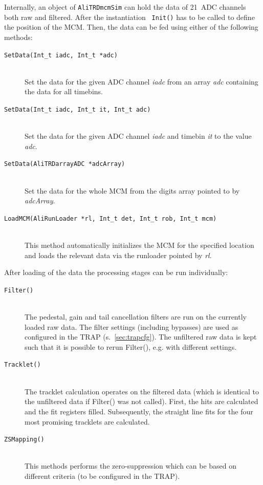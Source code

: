 \documentclass{alicetdr}
\begin{document}
Internally, an object of {\tt AliTRDmcmSim} can hold the data of
21~ADC channels both raw and filtered. After the instantiation {\tt
  Init()} has to be called to define the position of the MCM. Then,
the data can be fed using either of the following methods:
\begin{description}
\item[{\tt SetData(Int\_t iadc, Int\_t *adc)}] ~\\ Set the data for the
  given ADC channel {\it iadc} from an array {\it adc} containing the
  data for all timebins.
\item[{\tt SetData(Int\_t iadc, Int\_t it, Int\_t adc)}] ~\\ Set the data for the
  given ADC channel {\it iadc} and timebin {\it it} to the value {\it adc}.
\item[{\tt SetData(AliTRDarrayADC *adcArray)}] ~\\ Set the data for the
  whole MCM from the digits array pointed to by {\it adcArray}.
\item[{\tt LoadMCM(AliRunLoader *rl, Int\_t det, Int\_t rob, Int\_t mcm)}]
  ~\\ This method automatically initializes the MCM for the specified
  location and loads the relevant data via the runloader pointed by
  {\it rl}. 
\end{description}

After loading of the data the processing stages can be run
individually:
\begin{description}
\item[{\tt Filter()}] ~\\ The pedestal, gain and tail cancellation filters
  are run on the currently loaded raw data. The filter settings
  (including bypasses) are used as configured in the TRAP
  (s.~\ref{sec:trapcfg}). The unfiltered raw data is kept such that it
  is possible to rerun Filter(), e.g. with different settings. 
\item[{\tt Tracklet()}] ~\\ The tracklet calculation operates on the
  filtered data (which is identical to the unfiltered data if Filter()
  was not called). First, the hits are calculated and the fit
  registers filled. Subsequently, the straight line fits for the four
  most promising tracklets are calculated. 
\item[{\tt ZSMapping()}] ~\\ This methods performs the zero-suppression
  which can be based on different criteria (to be configured in the
  TRAP). 
\end{description}
\end{document}
